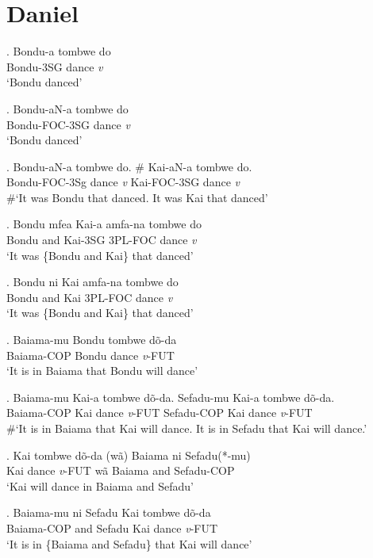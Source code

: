 \documentclass{assets/fieldnotes}
\begin{document}
\section{Daniel}
\exg. Bondu-a tombwe do\\
Bondu-3SG dance \textit{v}\\
`Bondu danced' 

\exg. Bondu-aN-a tombwe do\\
Bondu-FOC-3SG dance \textit{v}\\
`Bondu danced' 

\exg. Bondu-aN-a tombwe do. \# Kai-aN-a tombwe do.\\
Bondu-FOC-3Sg dance \textit{v} {} Kai-FOC-3SG dance \textit{v}\\
\#`It was Bondu that danced. It was Kai that danced'

\exg. Bondu mfea Kai-a amfa-na tombwe do\\
Bondu and Kai-3SG 3PL-FOC dance \textit{v}\\
`It was \{Bondu and Kai\} that danced'

\exg. Bondu ni Kai amfa-na tombwe do\\
Bondu and Kai 3PL-FOC dance \textit{v}\\
`It was \{Bondu and Kai\} that danced'

\exg. Baiama-mu Bondu tombwe dõ-da\\
Baiama-COP Bondu dance \textit{v}-FUT\\
`It is in Baiama that Bondu will dance'

\exg. Baiama-mu Kai-a tombwe dõ-da. Sefadu-mu Kai-a tombwe dõ-da.\\
Baiama-COP Kai dance \textit{v}-FUT Sefadu-COP Kai dance \textit{v}-FUT\\
\#`It is in Baiama that Kai will dance. It is in Sefadu that Kai will dance.'\\

\exg. Kai tombwe dõ-da (wã) Baiama ni Sefadu(*-mu)\\
Kai dance \textit{v}-FUT wã Baiama and Sefadu-COP\\
`Kai will dance in Baiama and Sefadu'

\exg. Baiama-mu ni Sefadu Kai tombwe dõ-da\\
Baiama-COP and Sefadu Kai dance \textit{v}-FUT\\
`It is in \{Baiama and Sefadu\} that Kai will dance'
\end{document}

